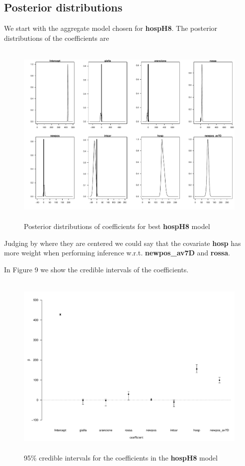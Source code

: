\documentclass[12pt,a4paper]{article}
\theoremstyle{definition}
\theoremstyle{remark}
\begin{document}
\subsection{Posterior distributions }
We start with the aggregate model chosen for \textbf{hospH8}. The posterior distributions of the coefficients are
\begin{figure}[htb!]
	\centering
	\includegraphics[width=155mm, height=90mm,scale=0.5]{posteriors_1.pdf}
	\caption{Posterior distributions of coefficients for best \textbf{hospH8} model}
\end{figure}

Judging by where they are centered we could say that the covariate \textbf{hosp} has more weight when performing inference w.r.t. \textbf{newpos\_av7D} and \textbf{rossa}.

In Figure 9 we show the credible intervals of the coefficients.
\begin{figure}[htb!]
	\centering
	\includegraphics[width=155mm, height=90mm,scale=0.5]{crint1.pdf}
	\caption{95\% credible intervals for the coefficients in the \textbf{hospH8} model}
\end{figure}
\end{document}
